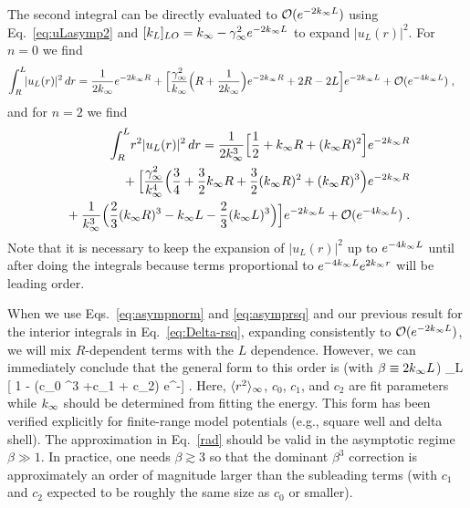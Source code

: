 	The second integral can be directly evaluated to $\mathcal{O}(e^{-2k_{\infty} L})$
	using Eq.~\eqref{eq:uLasymp2} and $[k_L]_{LO} = k_{\infty} - \gamma_\infty^2 e^{-2k_{\infty} L}$
	to expand $|u_L(r)|^2$.  For $n=0$ we find
	\begin{align}
	  \int_R^L\! &|u_L(r)|^2\, dr =  \frac{1}{2k_{\infty}}e^{-2k_{\infty} R} + \Bigl[
	  \frac{\gamma_\infty^2}{k_{\infty}} \Bigl(R + \frac{1}{2k_{\infty}}\Bigr)e^{-2k_{\infty} R} + 2R -
		2L \Bigr]e^{-2k_{\infty} L} + \mathcal{O}(e^{-4k_{\infty} L}) \;,
	  \label{eq:asympnorm}
	\end{align}
	and for $n=2$ we find
	\begin{align}
  	\int_R^L\! r^2 |u_L(r)|^2\, dr =
  	\frac{1}{2\kinf^3}\Bigl[ \frac12 + \kinf R + (\kinf R)^2 \Bigr]
		e^{-2\kinf R}
    \nonumber \\
		\null +  \Bigl[ \frac{\ANC^2}{\kinf^4} \Bigl( \frac34 + \frac32\kinf R +
		\frac32(\kinf R)^2 + (\kinf R)^3 \Bigr)e^{-2\kinf R}  \nonumber \\
    \null + \frac{1}{\kinf^3} \Bigl( \frac23 (\kinf R)^3 - \kinf L - \frac23
		(\kinf L)^3 \Bigr) \Bigr]e^{-2\kinf L}
		+ \mathcal{O}(e^{-4\kinf L})  \;.
    \label{eq:asymprsq}
	\end{align}
	Note that it is necessary to keep the expansion of $|u_L(r)|^2$ up to
	$e^{-4k_{\infty} L}$	until after doing the integrals because terms proportional
	to $e^{-4k_{\infty} L} e^{2k_{\infty} r}$ will be leading order.

	When we use Eqs.~\eqref{eq:asympnorm} and \eqref{eq:asymprsq} and our previous
	result for the interior integrals in Eq.~\eqref{eq:Delta-rsq}, expanding
	consistently to $\mathcal{O}(e^{-2k_{\infty} L})$, we will mix $R$-dependent
	terms with the $L$ dependence.  However, we can immediately conclude that
	the general form to this order is (with $\beta \equiv 2k_{\infty} L$)
	\bea
	 	\rsqav_L \approx {\rsqinf}[ 1 - (c_0 \beta^3 +c_1 \beta + c_2) e^{-\beta}]
	  \;.
		\label{rad}
	\eea
	Here, $\langle r^2 \rangle_{\infty}$, $c_0$, $c_1$, and $c_2$ are fit parameters while $k_{\infty}$
	should be determined from fitting the energy. 	This form has been verified
	explicitly for finite-range model potentials (e.g., square well
	and delta shell). 	The approximation in Eq.~\eqref{rad} should be valid
	in the asymptotic regime $\beta\gg 1$.  In practice, one needs
	$\beta\gtrsim 3$ so that the dominant $\beta^3$ correction is
	approximately an order of magnitude larger than the subleading terms
	(with $c_1$ and $c_2$ expected to be roughly the same size as
	$c_0$ or smaller).

